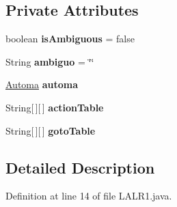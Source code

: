 \subsection*{Private Attributes}
\begin{DoxyCompactItemize}
\item 
\hypertarget{classcontext_free_1_1scanner_1_1_l_a_l_r1_a42dc2f89ec2c642200c0d9bf78d5ce25}{boolean {\bfseries is\-Ambiguous} = false}\label{classcontext_free_1_1scanner_1_1_l_a_l_r1_a42dc2f89ec2c642200c0d9bf78d5ce25}

\item 
\hypertarget{classcontext_free_1_1scanner_1_1_l_a_l_r1_a95bbe0235c59768f32b942ba476df180}{String {\bfseries ambiguo} = \char`\"{}\char`\"{}}\label{classcontext_free_1_1scanner_1_1_l_a_l_r1_a95bbe0235c59768f32b942ba476df180}

\item 
\hypertarget{classcontext_free_1_1scanner_1_1_l_a_l_r1_a9abae9a81b359b59dcbcfdecbf809068}{\hyperlink{classcontext_free_1_1scanner_1_1_automa}{Automa} {\bfseries automa}}\label{classcontext_free_1_1scanner_1_1_l_a_l_r1_a9abae9a81b359b59dcbcfdecbf809068}

\item 
\hypertarget{classcontext_free_1_1scanner_1_1_l_a_l_r1_af6f7fe36eb851deda2a609a22c300b7c}{String\mbox{[}$\,$\mbox{]}\mbox{[}$\,$\mbox{]} {\bfseries action\-Table}}\label{classcontext_free_1_1scanner_1_1_l_a_l_r1_af6f7fe36eb851deda2a609a22c300b7c}

\item 
\hypertarget{classcontext_free_1_1scanner_1_1_l_a_l_r1_a95bedde44fe8cd140e6ca0739928e0f7}{String\mbox{[}$\,$\mbox{]}\mbox{[}$\,$\mbox{]} {\bfseries goto\-Table}}\label{classcontext_free_1_1scanner_1_1_l_a_l_r1_a95bedde44fe8cd140e6ca0739928e0f7}

\end{DoxyCompactItemize}


\subsection{Detailed Description}


Definition at line 14 of file L\-A\-L\-R1.\-java.



